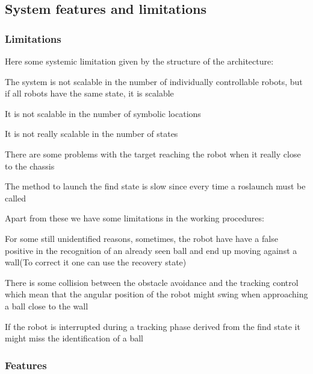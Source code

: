 \subsection*{System features and limitations}

\subsubsection*{Limitations}

Here some systemic limitation given by the structure of the architecture\+:
\begin{DoxyItemize}
\item The system is not scalable in the number of individually controllable robots, but if all robots have the same state, it is scalable
\item It is not scalable in the number of symbolic locations
\item It is not really scalable in the number of states
\item There are some problems with the target reaching the robot when it really close to the chassis
\item The method to launch the find state is slow since every time a roslaunch must be called
\end{DoxyItemize}

Apart from these we have some limitations in the working procedures\+:
\begin{DoxyItemize}
\item For some still unidentified reasons, sometimes, the robot have have a false positive in the recognition of an already seen ball and end up moving against a wall(\+To correct it one can use the recovery state)
\item There is some collision between the obstacle avoidance and the tracking control which mean that the angular position of the robot might swing when approaching a ball close to the wall
\item If the robot is interrupted during a tracking phase derived from the find state it might miss the identification of a ball
\end{DoxyItemize}

\subsubsection*{Features}

